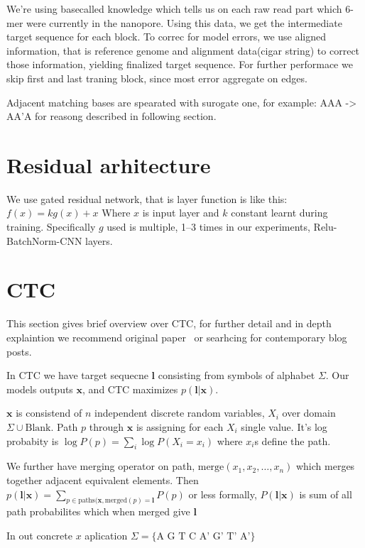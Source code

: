 \documentclass[times, utf8, seminar]{fer}
\begin{document}
We're using basecalled knowledge which tells us on each raw read part which 6-mer were currently in the nanopore. Using this data, we get the intermediate target sequence for each block. To correc for model errors, we use aligned information, that is reference genome and alignment data(cigar string) to correct those information, yielding finalized target sequence. For further performace we skip first and last traning block, since most error aggregate on edges.

Adjacent matching bases are spearated with surogate one, for example: AAA -> AA'A for reasong described in following section.

\section{Residual arhitecture}

We use gated residual network, that is layer function is like this: $f(x) = k g(x) + x$ Where $x$ is input layer and $k$ constant learnt during training. Specifically $g$ used is multiple, 1--3 times in our experiments, Relu-BatchNorm-CNN layers.

\section{CTC}

This section gives brief overview over CTC, for further detail and in depth explaintion we recommend original paper~\cite{graves2006connectionist} or searhcing for contemporary blog posts.

In CTC we have target sequecne $\mathbf{l}$ consisting from symbols of alphabet $\Sigma$. Our models outputs $\mathbf{x}$, and CTC maximizes $p(\mathbf{l}|\mathbf{x})$.

$\mathbf{x}$ is consistend of $n$ independent discrete random variables, $X_i$  over domain $\Sigma \cup \text{Blank}$. Path $p$ through $\mathbf{x}$ is assigning for each $X_i$ single value. It's log probabity is $\log P(p) = \sum_i {\log P(X_i=x_i)}$ where $x_i$s define the path.

We further have merging operator on path, $\text{merge}(x_1, x_2, \ldots, x_n)$ which merges together adjacent equivalent elements. Then $p(\mathbf{l}|\mathbf{x}) = \sum_{p\in\text{paths}(\mathbf{x}, \text{merged}(p) = \mathbf{l}}{P(p)}$ or less formally, $P(\mathbf{l}|\mathbf{x})$ is sum of all path probabilites which when merged give $\mathbf{l}$

In out concrete $x$ aplication $\Sigma = \{\text{A G T C A' G' T' A'}\}$
\end{document}
